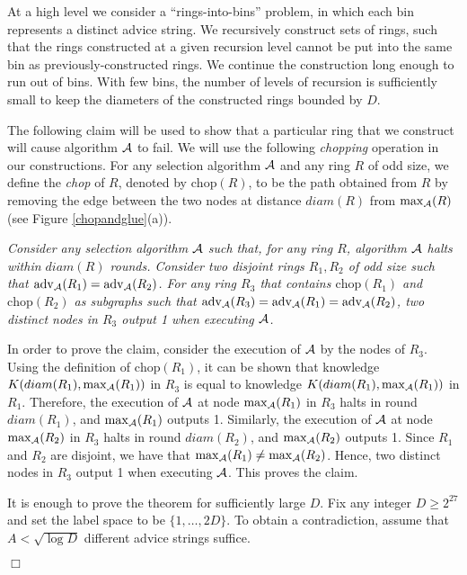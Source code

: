 \documentclass[11pt]{article}
\newcommand{\qed}{\hfill $\Box$ \bigbreak}
\newenvironment{proof}{\noindent {\bf Proof.}}{\qed}
\newcommand{\algname}{\ensuremath{{\cal A}}}
\newcommand{\diam}[1]{\ensuremath{{diam}(#1)}}
\newcommand{\chop}[1]{\ensuremath{\mathrm{chop}(#1)}}
\newcommand{\selected}[1]{\ensuremath{\mathrm{max}_{\cal A}(#1)}}
\newcommand{\advice}[1]{\ensuremath{\mathrm{adv}_{\algname}(#1)}}
\begin{document}
\begin{proof}
At a high level we consider a ``rings-into-bins'' problem, in which each bin represents a distinct advice string. We recursively construct sets of rings, such that 
the rings constructed at a given recursion level cannot be put into the same bin as previously-constructed rings. We continue the construction long enough to run out of bins. With few bins, the number of levels of recursion is sufficiently small to keep the diameters of the constructed rings bounded by $D$.

The following claim will be used to show that a particular ring that we construct will cause algorithm $\algname$ to fail.
We will use the following {\em chopping} operation in our constructions.
For any selection algorithm $\algname$ and any ring $R$ of odd size, we define the \emph{chop} of $R$, denoted by $\chop{R}$, to be the path obtained from $R$ by removing the edge between the two nodes at distance $\diam{R}$ from $\selected{R}$ (see Figure \ref{chopandglue}(a)).



\vspace{3mm} 
\textit{Consider any selection algorithm $\algname$ such that, for any ring $R$, algorithm $\algname$ halts within $\diam{R}$ rounds. Consider two disjoint rings $R_1, R_2$ of odd size such that $\advice{R_1} = \advice{R_2}$. For any ring $R_3$ that contains $\chop{R_1}$ and $\chop{R_2}$ as subgraphs such that $\advice{R_3} = \advice{R_1} = \advice{R_2}$, two distinct nodes in $R_3$ output 1 when executing $\algname$.}
\vspace{3mm}

In order to prove the claim, 
consider the execution of $\algname$ by the nodes of $R_3$. Using the definition of $\chop{R_1}$, it can be shown that knowledge $K(\diam{R_1},\selected{R_1})$ in $R_3$ is equal to knowledge $K(\diam{R_1},\selected{R_1})$ in $R_1$. Therefore, the execution of $\algname$ at node $\selected{R_1}$ in $R_3$ halts in round $\diam{R_1}$, and $\selected{R_1}$ outputs 1. Similarly, the execution of $\algname$ at node $\selected{R_2}$ in $R_3$ halts in round $\diam{R_2}$, and $\selected{R_2}$ outputs 1. Since $R_1$ and $R_2$ are disjoint, we have that $\selected{R_1} \neq \selected{R_2}$. Hence, two distinct nodes in $R_3$ output 1 when executing $\algname$.
This proves the claim.



It is enough to prove the theorem for sufficiently large $D$.
Fix any integer $D \geq 2^{27}$ and set the label space to be $\{1,\ldots,2D\}$. To obtain a contradiction, assume that $A < \sqrt{\log D}$ different advice strings suffice. 


\end{proof}
\end{document}
